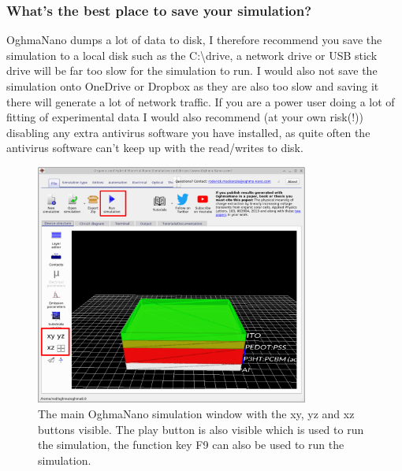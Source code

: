 \subsubsection{What's the best place to save your simulation?}
OghmaNano dumps a lot of data to disk, I therefore recommend you save the simulation to a local disk such as the C:\textbackslash drive, a network drive or USB stick drive will be far too slow for the simulation to run.  I would also not save the simulation onto OneDrive or Dropbox as they are also too slow and saving it there will generate a lot of network traffic.  If you are a power user doing a lot of fitting of experimental data I would also recommend (at your own risk(!)) disabling any extra antivirus software you have installed, as quite often the antivirus software can't keep up with the read/writes to disk.

\begin{figure}[H]
\centering
\includegraphics[width=0.8\textwidth,height=0.5\textwidth]{./images/running/simple_interface.png}
\caption{The main OghmaNano simulation window with the xy, yz and xz buttons visible. The play button is also visible which is used to run the simulation, the function key F9 can also be used to run the simulation.}
\label{fig:simpleinterface}
\end{figure}





